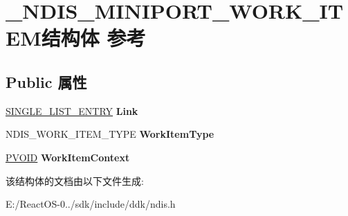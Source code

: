 \hypertarget{struct___n_d_i_s___m_i_n_i_p_o_r_t___w_o_r_k___i_t_e_m}{}\section{\+\_\+\+N\+D\+I\+S\+\_\+\+M\+I\+N\+I\+P\+O\+R\+T\+\_\+\+W\+O\+R\+K\+\_\+\+I\+T\+E\+M结构体 参考}
\label{struct___n_d_i_s___m_i_n_i_p_o_r_t___w_o_r_k___i_t_e_m}
\subsection*{Public 属性}
\begin{DoxyCompactItemize}
\item 
\mbox{\label{struct___n_d_i_s___m_i_n_i_p_o_r_t___w_o_r_k___i_t_e_m_aeb53e14fde536c4834035a43b262940f}} 
\hyperlink{struct___s_i_n_g_l_e___l_i_s_t___e_n_t_r_y}{S\+I\+N\+G\+L\+E\+\_\+\+L\+I\+S\+T\+\_\+\+E\+N\+T\+RY} {\bfseries Link}
\item 
\mbox{\label{struct___n_d_i_s___m_i_n_i_p_o_r_t___w_o_r_k___i_t_e_m_a4c678f4d203fc4f5b6ac5c4fb9242475}} 
N\+D\+I\+S\+\_\+\+W\+O\+R\+K\+\_\+\+I\+T\+E\+M\+\_\+\+T\+Y\+PE {\bfseries Work\+Item\+Type}
\item 
\mbox{\label{struct___n_d_i_s___m_i_n_i_p_o_r_t___w_o_r_k___i_t_e_m_a68a166c096fa0a4db950aacd97301f2b}} 
\hyperlink{interfacevoid}{P\+V\+O\+ID} {\bfseries Work\+Item\+Context}
\end{DoxyCompactItemize}


该结构体的文档由以下文件生成\+:\begin{DoxyCompactItemize}
\item 
E\+:/\+React\+O\+S-\/0../sdk/include/ddk/ndis.\+h\end{DoxyCompactItemize}
